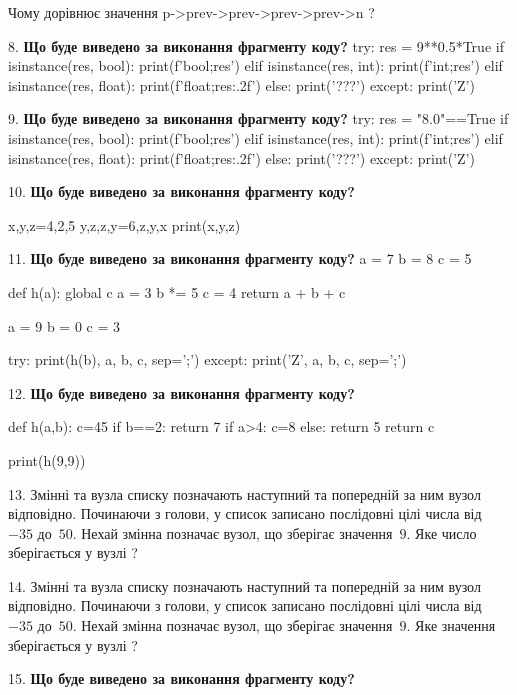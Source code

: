 \documentclass[11pt]{article}
\begin{document}
Чому дорівнює значення p->prev->prev->prev->prev->n ?\par\vspace{5mm}
8. \textbf{Що буде виведено за виконання фрагменту коду?}
try:
    res = 9**0.5*True
    if isinstance(res, bool):
        print(f'bool;{res}')
    elif isinstance(res, int):
        print(f'int;{res}')
    elif isinstance(res, float):
        print(f'float;{res:.2f}')
    else:
        print('???')
except:
    print('Z')
\par\vspace{5mm}
9. \textbf{Що буде виведено за виконання фрагменту коду?}
try:
    res = "8.0"==True
    if isinstance(res, bool):
        print(f'bool;{res}')
    elif isinstance(res, int):
        print(f'int;{res}')
    elif isinstance(res, float):
        print(f'float;{res:.2f}')
    else:
        print('???')
except:
    print('Z')
\par\vspace{5mm}
10. \textbf{Що буде виведено за виконання фрагменту коду?}

x,y,z=4,2,5
y,z,z,y=6,z,y,x
print(x,y,z)
\par\vspace{5mm}
11. \textbf{Що буде виведено за виконання фрагменту коду?}
a = 7
b = 8
c = 5

def h(a):
global c    a = 3
    b *= 5
    c = 4
    return a + b + c

a = 9
b = 0
c = 3

try:
    print(h(b), a, b, c, sep=';')
except:
    print('Z', a, b, c, sep=';')
\par\vspace{5mm}
12. \textbf{Що буде виведено за виконання фрагменту коду?}

def h(a,b):
    c=45
    if b==2:
        return 7
    if a>4:
         c=8
    else: 
        return 5
    return c

print(h(9,9))
\par\vspace{5mm}
13. 
Змінні  та  вузла списку позначають наступний та попередній за ним вузол відповідно. Починаючи з голови, у список записано послідовні цілі числа від~$-35$ до~$50$. Нехай змінна  позначає вузол, що зберігає значення~$9$.
Яке число зберігається у вузлі  ?
\par\vspace{5mm}
14. 
Змінні  та  вузла списку позначають наступний та попередній за ним вузол відповідно. Починаючи з голови, у список записано послідовні цілі числа від~$-35$ до~$50$. Нехай змінна  позначає вузол, що зберігає значення~$9$.
Яке значення зберігається у вузлі  ?
\par\vspace{5mm}
15. \textbf{Що буде виведено за виконання фрагменту коду?}
\end{document}
